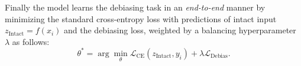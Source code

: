 %
Finally the model learns the debiasing task in an \emph{end-to-end} manner by minimizing the standard cross-entropy loss with predictions of intact input $z_{\mathrm{Intact}}=f(x_i)$ and the debiasing loss, weighted by a balancing hyperparameter $\lambda$ as follows:
\begin{equation}
    \theta^{*} = \arg\min_{\theta} \mathcal{L}_{\mathrm{CE}}(z_{\mathrm{Intact}}, y_i) + \lambda \mathcal{L}_{\mathrm{Debias}}.
\end{equation}





